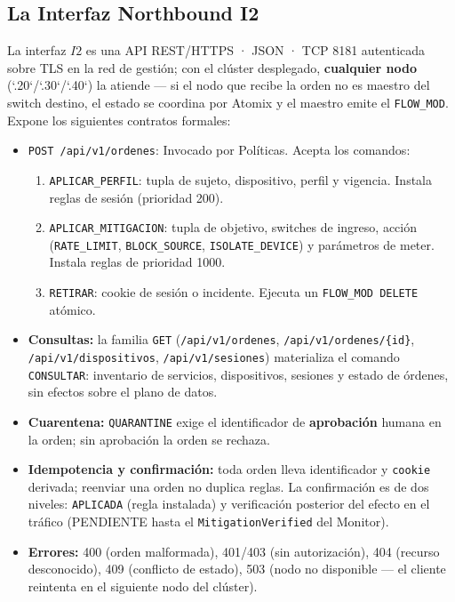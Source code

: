 \documentclass[11pt,a4paper]{report}
\begin{document}
\subsection{La Interfaz Northbound I2}
La interfaz $I2$ es una API REST/HTTPS · JSON · TCP 8181 autenticada sobre TLS en la red de gestión; con el clúster desplegado, \textbf{cualquier nodo} (`.20`/`.30`/`.40`) la atiende — si el nodo que recibe la orden no es maestro del switch destino, el estado se coordina por Atomix y el maestro emite el \texttt{FLOW\_MOD}. Expone los siguientes contratos formales:
\begin{itemize}[leftmargin=*]
    \item \texttt{POST /api/v1/ordenes}: Invocado por Políticas. Acepta los comandos:
    \begin{enumerate}
        \item \texttt{APLICAR\_PERFIL}: tupla de sujeto, dispositivo, perfil y vigencia. Instala reglas de sesión (prioridad 200).
        \item \texttt{APLICAR\_MITIGACION}: tupla de objetivo, switches de ingreso, acción (\texttt{RATE\_LIMIT}, \texttt{BLOCK\_SOURCE}, \texttt{ISOLATE\_DEVICE}) y parámetros de meter. Instala reglas de prioridad 1000.
        \item \texttt{RETIRAR}: cookie de sesión o incidente. Ejecuta un \texttt{FLOW\_MOD DELETE} atómico.
    \end{enumerate}
    \item \textbf{Consultas:} la familia \texttt{GET} (\texttt{/api/v1/ordenes}, \texttt{/api/v1/ordenes/\{id\}}, \texttt{/api/v1/dispositivos}, \texttt{/api/v1/sesiones}) materializa el comando \texttt{CONSULTAR}: inventario de servicios, dispositivos, sesiones y estado de órdenes, sin efectos sobre el plano de datos.
    \item \textbf{Cuarentena:} \texttt{QUARANTINE} exige el identificador de \textbf{aprobación} humana en la orden; sin aprobación la orden se rechaza.
    \item \textbf{Idempotencia y confirmación:} toda orden lleva identificador y \texttt{cookie} derivada; reenviar una orden no duplica reglas. La confirmación es de dos niveles: \texttt{APLICADA} (regla instalada) y verificación posterior del efecto en el tráfico (PENDIENTE hasta el \texttt{MitigationVerified} del Monitor).
    \item \textbf{Errores:} 400 (orden malformada), 401/403 (sin autorización), 404 (recurso desconocido), 409 (conflicto de estado), 503 (nodo no disponible — el cliente reintenta en el siguiente nodo del clúster).
\end{itemize}
\end{document}

